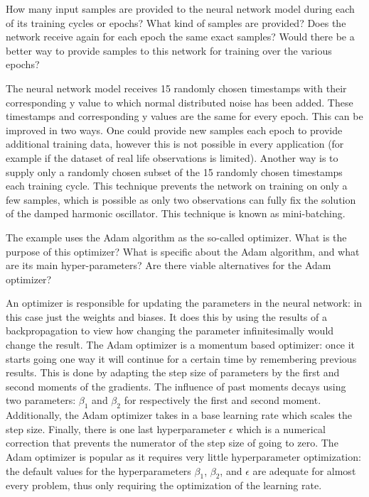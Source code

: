 \documentclass[12pt, a4paper]{report}
\begin{document}
\begin{tcolorbox}[title=Methods Question 5,sharp corners, colframe=black, colback=white]
    How many input samples are provided to the neural network model during each of its training cycles or epochs? What kind of samples are provided? Does the network receive again for each epoch the same exact samples? Would there be a better way to provide samples to this network for training over the various epochs?
\end{tcolorbox}
The neural network model receives 15 randomly chosen timestamps with their corresponding y value to which normal distributed noise has been added. These timestamps and corresponding y values are the same for every epoch. This can be improved in two ways. One could provide new samples each epoch to provide additional training data, however this is not possible in every application (for example if the dataset of real life observations is limited). Another way is to supply only a randomly chosen subset of the 15 randomly chosen timestamps each training cycle. This technique prevents the network on training on only a few samples, which is possible as only two observations can fully fix the solution of the damped harmonic oscillator. This technique is known as mini-batching.\\
\begin{tcolorbox}[title=Methods Question 6,sharp corners, colframe=black, colback=white]
    The example uses the Adam algorithm as the so-called optimizer. What is the purpose of this optimizer? What is specific about the Adam algorithm, and what are its main hyper-parameters? Are there viable alternatives for the Adam optimizer?
\end{tcolorbox}
An optimizer is responsible for updating the parameters in the neural network: in this case just the weights and biases. It does this by using the results of a backpropagation to view how changing the parameter infinitesimally would change the result. The Adam optimizer is a momentum based optimizer: once it starts going one way it will continue for a certain time by remembering previous results. This is done by adapting the step size of parameters by the first and second moments of the gradients. The influence of past moments decays using two parameters: $\beta_1$ and $\beta_2$ for respectively the first and second moment. Additionally, the Adam optimizer takes in a base learning rate which scales the step size. Finally, there is one last hyperparameter $\epsilon$ which is a numerical correction that prevents the numerator of the step size of going to zero. The Adam optimizer is popular as it requires very little hyperparameter optimization: the default values for the hyperparameters $\beta_1$, $\beta_2$, and $\epsilon$ are adequate for almost every problem, thus only requiring the optimization of the learning rate.\\
\end{document}

